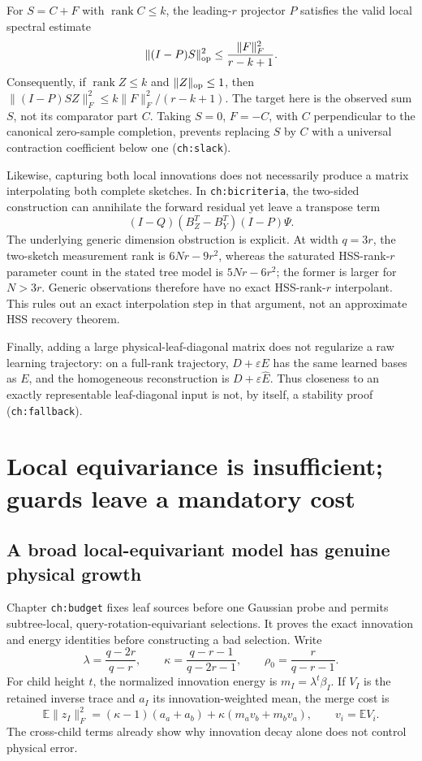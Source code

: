 \documentclass[11pt,oneside,openany,a4paper]{report}
\numberwithin{equation}{chapter}
\theoremstyle{definition}
\theoremstyle{remark}
\begin{document}
For $S=C+F$ with $\operatorname{rank}C\le k$, the leading-$r$
projector $P$ satisfies the valid local spectral estimate
\[
 \|(I-P)S\|_{\rm op}^2
       \le\frac{\|F\|_F^2}{r-k+1}.
\]
Consequently, if $\operatorname{rank}Z\le k$ and
$\|Z\|_{\rm op}\le1$, then
$\|(I-P)SZ\|_F^2\le k\|F\|_F^2/(r-k+1)$.
The target here is the observed sum $S$, not its comparator part
$C$.  Taking $S=0$, $F=-C$, with $C$ perpendicular to the
canonical zero-sample completion, prevents replacing $S$ by $C$
with a universal contraction coefficient below one
(\texttt{ch:slack}).

Likewise, capturing both local innovations does not necessarily
produce a matrix interpolating both complete sketches.  In
\texttt{ch:bicriteria}, the two-sided construction can annihilate
the forward residual yet leave a transpose term
\[
 (I-Q)(B_Z^T-B_Y^T)(I-P)\Psi.
\]
The underlying generic dimension obstruction is explicit.  At
width $q=3r$, the two-sketch measurement rank is
$6Nr-9r^2$, whereas the saturated HSS-rank-$r$ parameter count
in the stated tree model is $5Nr-6r^2$; the former is larger for
$N>3r$.  Generic observations therefore have no exact
HSS-rank-$r$ interpolant.  This rules out an exact interpolation
step in that argument, not an approximate HSS recovery theorem.

Finally, adding a large physical-leaf-diagonal matrix does not
regularize a raw learning trajectory: on a full-rank trajectory,
$D+\varepsilon E$ has the same learned bases as $E$, and the
homogeneous reconstruction is $D+\varepsilon\widehat E$.
Thus closeness to an exactly representable leaf-diagonal input is
not, by itself, a stability proof (\texttt{ch:fallback}).

\section{Local equivariance is insufficient; guards leave a mandatory cost}
\label{origobs:guards}

\subsection{A broad local-equivariant model has genuine physical growth}

Chapter \texttt{ch:budget} fixes leaf sources before one Gaussian
probe and permits subtree-local, query-rotation-equivariant
selections.  It proves the exact innovation and energy identities
before constructing a bad selection.  Write
\[
 \lambda=\frac{q-2r}{q-r},\qquad
 \kappa=\frac{q-r-1}{q-2r-1},\qquad
 \rho_0=\frac r{q-r-1}.
\]
For child height $t$, the normalized innovation energy is
$m_I=\lambda^t\beta_I$.  If $V_I$ is the retained inverse trace
and $a_I$ its innovation-weighted mean, the merge cost is
\[
 \mathbb E\|z_I\|_F^2
 =(\kappa-1)(a_a+a_b)+\kappa(m_av_b+m_bv_a),
 \qquad v_i=\mathbb EV_i.
\]
The cross-child terms already show why innovation decay alone
does not control physical error.
\end{document}
